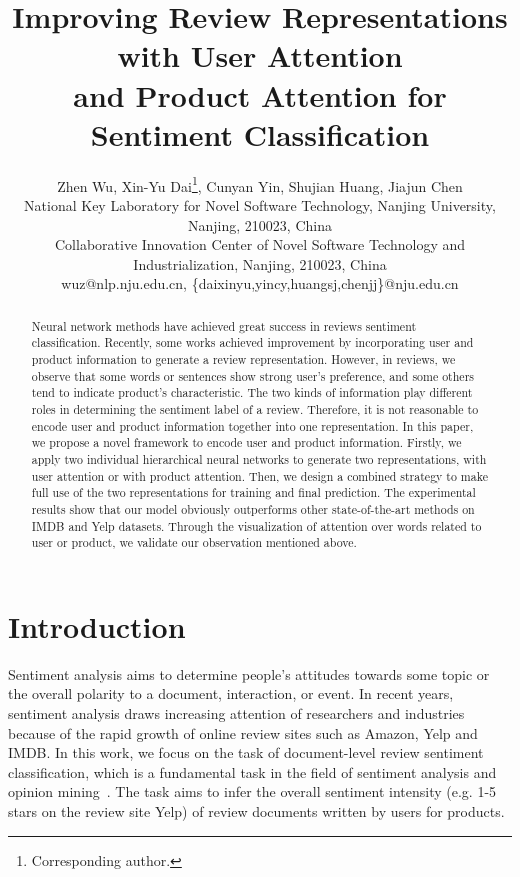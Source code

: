 \documentclass[letterpaper]{article} \usepackage{aaai18}  \usepackage{times}  \usepackage{helvet}  \usepackage{courier}  \usepackage{url}  \usepackage{graphicx}  \frenchspacing  \usepackage{amsmath}
\begin{document}
\title{Improving Review Representations with User Attention \\and Product Attention for Sentiment Classification}

\author{Zhen Wu, Xin-Yu Dai\protect\thanks{Corresponding author.}, Cunyan Yin, Shujian Huang, Jiajun Chen\\
National Key Laboratory for Novel Software Technology, Nanjing University, Nanjing, 210023, China\\
 Collaborative Innovation Center of Novel Software Technology and Industrialization, Nanjing, 210023, China\\
wuz@nlp.nju.edu.cn, \{daixinyu,yincy,huangsj,chenjj\}@nju.edu.cn\\
}
\maketitle
\begin{abstract}
Neural network methods have achieved great success in reviews sentiment classification. Recently, some works achieved improvement by incorporating user and product information to generate a review representation. However, in reviews, we observe that some words or sentences show strong user's preference, and some others tend to indicate product's characteristic. The two kinds of information play different roles in determining the sentiment label of a review. Therefore, it is not reasonable to encode user and product information together into one representation. In this paper, we propose a novel framework to encode user and product information. Firstly, we apply two individual hierarchical neural networks to generate two representations, with user attention or with product attention. Then, we design a combined strategy to make full use of the two representations for training and final prediction. The experimental results show that our model obviously outperforms other state-of-the-art methods on IMDB and Yelp datasets. Through the visualization of attention over words related to user or product, we validate our observation mentioned above.
\end{abstract}


\section{Introduction}
\noindent Sentiment analysis aims to determine people's attitudes towards some topic or the overall polarity to a document, interaction, or event. In recent years, sentiment analysis draws increasing attention of researchers and industries because of the rapid growth of online review sites such as Amazon, Yelp and IMDB. In this work, we focus on the task of document-level review sentiment classification, which is a fundamental task in the field of sentiment analysis and opinion mining~\cite{INR-011}. The task aims to infer the overall sentiment intensity (e.g. 1-5 stars on the review site Yelp) of review documents written by users for products.
\end{document}
